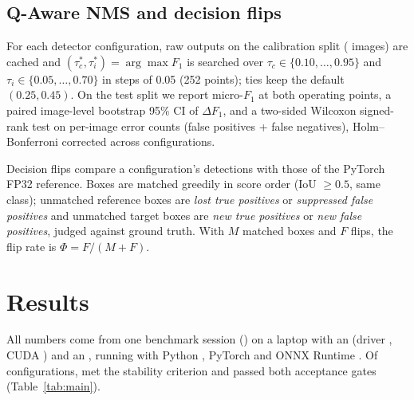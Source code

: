 \documentclass[conference]{IEEEtran}
\begin{document}
\subsection{Q-Aware NMS and decision flips}
For each detector configuration, raw outputs on the calibration split ( images) are cached and
$(\tau_c^*, \tau_i^*) = \arg\max F_1$ is searched over $\tau_c \in \{0.10,\dots,0.95\}$ and
$\tau_i \in \{0.05,\dots,0.70\}$ in steps of 0.05 (252 points); ties keep the default $(0.25, 0.45)$. On the test split we
report micro-$F_1$ at both operating points, a paired image-level bootstrap 95\% CI of $\Delta F_1$, and a two-sided
Wilcoxon signed-rank test on per-image error counts (false positives + false negatives), Holm--Bonferroni corrected
across configurations.

Decision flips compare a configuration's detections with those of the PyTorch FP32 reference. Boxes are matched
greedily in score order (IoU $\ge 0.5$, same class); unmatched reference boxes are \emph{lost true positives} or
\emph{suppressed false positives} and unmatched target boxes are \emph{new true positives} or \emph{new false positives},
judged against ground truth. With $M$ matched boxes and $F$ flips, the flip rate is $\Phi = F / (M + F)$.

\section{Results}
All numbers come from one benchmark session (\texttt{}) on a laptop with an 
(driver , CUDA ) and an , running  with Python ,
PyTorch  and ONNX Runtime . Of  configurations,  met the
stability criterion and  passed both acceptance gates (Table~\ref{tab:main}).

\begin{table}[t]
\caption{Batch-1 results per configuration: pooled model-path latency (ms) with bootstrap 95\% CI, end-to-end p50,
session-median CV, maximum relative output error vs PyTorch FP32 (CPU), task quality on the test split (detector:
mAP@50; autoencoder: image AUROC) with the delta to the FP32 reference, and model size (MB = $2^{20}$ bytes).}
\label{tab:main}
\centering
\resizebox{\textwidth}{!}{}
\end{table}
\end{document}
